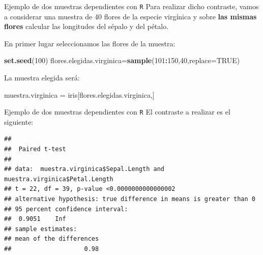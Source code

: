 \documentclass[
  ignorenonframetext,
]{beamer}
\newenvironment{Shaded}{\begin{snugshade}}{\end{snugshade}}
\newcommand{\DataTypeTok}[1]{\textcolor[rgb]{0.13,0.29,0.53}{#1}}
\newcommand{\DecValTok}[1]{\textcolor[rgb]{0.00,0.00,0.81}{#1}}
\newcommand{\KeywordTok}[1]{\textcolor[rgb]{0.13,0.29,0.53}{\textbf{#1}}}
\newcommand{\NormalTok}[1]{#1}
\newcommand{\OperatorTok}[1]{\textcolor[rgb]{0.81,0.36,0.00}{\textbf{#1}}}
\newcommand{\OtherTok}[1]{\textcolor[rgb]{0.56,0.35,0.01}{#1}}
\newcommand{\StringTok}[1]{\textcolor[rgb]{0.31,0.60,0.02}{#1}}
\begin{document}
\begin{frame}[fragile]{Ejemplo de dos muestras dependientes con
\texttt{R}}
\protect\hypertarget{ejemplo-de-dos-muestras-dependientes-con-r-1}{}
Para realizar dicho contraste, vamos a considerar una muestra de 40
flores de la especie virgínica y sobre \textbf{las mismas flores}
calcular las longitudes del sépalo y del pétalo.

En primer lugar seleccionamos las flores de la muestra:

\begin{Shaded}
\begin{Highlighting}[]
\KeywordTok{set.seed}\NormalTok{(}\DecValTok{100}\NormalTok{)}
\NormalTok{flores.elegidas.virginica=}\KeywordTok{sample}\NormalTok{(}\DecValTok{101}\OperatorTok{:}\DecValTok{150}\NormalTok{,}\DecValTok{40}\NormalTok{,}\DataTypeTok{replace=}\OtherTok{TRUE}\NormalTok{)}
\end{Highlighting}
\end{Shaded}

La muestra elegida será:

\begin{Shaded}
\begin{Highlighting}[]
\NormalTok{muestra.virginica =}\StringTok{ }\NormalTok{iris[flores.elegidas.virginica,]}
\end{Highlighting}
\end{Shaded}
\end{frame}

\begin{frame}[fragile]{Ejemplo de dos muestras dependientes con
\texttt{R}}
\protect\hypertarget{ejemplo-de-dos-muestras-dependientes-con-r-2}{}
El contraste a realizar es el siguiente:

\begin{Shaded}
\end{Shaded}

\begin{verbatim}
## 
##  Paired t-test
## 
## data:  muestra.virginica$Sepal.Length and muestra.virginica$Petal.Length
## t = 22, df = 39, p-value <0.0000000000000002
## alternative hypothesis: true difference in means is greater than 0
## 95 percent confidence interval:
##  0.9051    Inf
## sample estimates:
## mean of the differences 
##                    0.98
\end{verbatim}
\end{frame}
\end{document}
